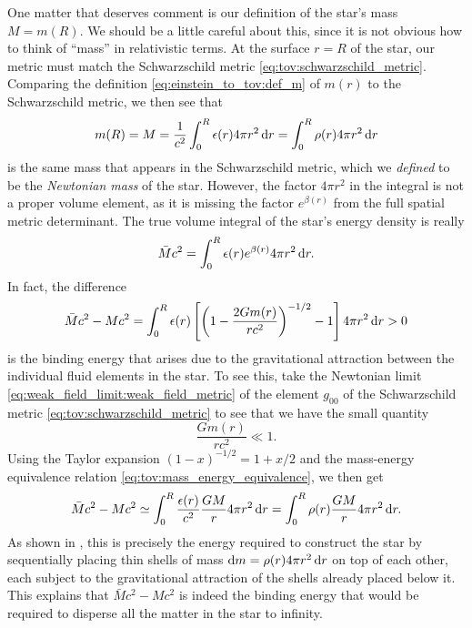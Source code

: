 One matter that deserves comment is our definition of the star's mass $M = m(R)$.
We should be a little careful about this, since it is not obvious how to think of ``mass'' in relativistic terms.
At the surface $r=R$ of the star, our metric must match the Schwarzschild metric \eqref{eq:tov:schwarzschild_metric}.
Comparing the definition \eqref{eq:einstein_to_tov:def_m} of $m(r)$ to the Schwarzschild metric, we then see that
\begin{equation}
	m(R) = M = \frac{1}{c^2} \integral{\epsilon(r) 4 \pi r^2}{r}{0}{R} = \integral{\rho(r) 4 \pi r^2}{r}{0}{R}
	\label{eq:einstein_to_tov:schwarzschild_mass}
\end{equation}
is the same mass that appears in the Schwarzschild metric, which we \emph{defined} to be the \emph{Newtonian mass} of the star.
However, the factor $4 \pi r^2$ in the integral is not a proper volume element, as it is missing the factor $e^{\beta(r)}$ from the full spatial metric determinant.
The true volume integral of the star's energy density is really
\begin{equation*}
	\bar{M} c^2 = \integral{\epsilon(r) e^{\beta(r)} 4 \pi r^2}{r}{0}{R} .
\end{equation*}
In fact, the difference
\begin{equation*}
	\bar{M} c^2 - M c^2 = \integral{\epsilon(r) \left[ \left( 1-\frac{2Gm(r)}{rc^2} \right)^{-1/2} - 1 \right] 4 \pi r^2}{r}{0}{R} > 0
\end{equation*}
is the binding energy that arises due to the gravitational attraction between the individual fluid elements in the star.
To see this, take the Newtonian limit \eqref{eq:weak_field_limit:weak_field_metric} of the element $g_{00}$ of the Schwarzschild metric \eqref{eq:tov:schwarzschild_metric} to see that we have the small quantity
\begin{equation}
	\frac{G m(r)}{rc^2} \ll 1 .
	\label{eq:weak_field_limit:small_gmr}
\end{equation}
Using the Taylor expansion $(1 - x)^{-1/2} = 1 + x/2$ and the mass-energy equivalence relation \eqref{eq:tov:mass_energy_equivalence}, we then get
\begin{equation}
	\bar{M} c^2 - M c^2 \taylor \integral{\frac{\epsilon(r)}{c^2} \frac{GM}{r} 4 \pi r^2}{r}{0}{R}
	                    =       \integral{\rho(r) \frac{GM}{r} 4 \pi r^2}{r}{0}{R} .
\end{equation}
As shown in \cite[exercise 23.7]{ref:mtw}, this is precisely the energy required to construct the star by sequentially placing thin shells of mass $\dif m = \rho(r) 4 \pi r^2 \dif r$ on top of each other, each subject to the gravitational attraction of the shells already placed below it.
This explains that $\bar{M} c^2 - M c^2$ is indeed the binding energy that would be required to disperse all the matter in the star to infinity.

